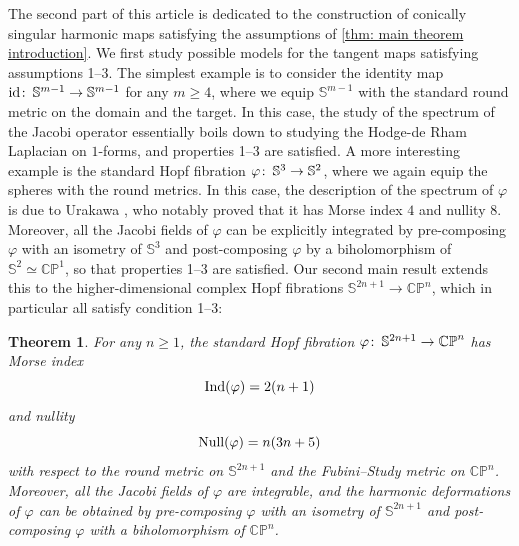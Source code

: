 \documentclass{article}
\numberwithin{equation}{section}        %
\theoremstyle{bfnote}
\newtheorem{thm}{Theorem}[section]          %
\theoremstyle{definition}
\theoremstyle{bfremark}
\newcommand{\col}{\colon \thinspace}        %
\newcommand{\Sp}{\mathbb{S}}                %
\DeclareMathOperator{\id}{id}                   %
\begin{document}
The second part of this article is dedicated to the construction of conically singular harmonic maps satisfying the assumptions of \cref{thm: main theorem introduction}. We first study possible models for the tangent maps satisfying assumptions 1--3. The simplest example is to consider the identity map $\id \col \Sp^{m-1} \to \Sp^{m-1}$ for any $m \geq 4$, where we equip $\Sp^{m-1}$ with the standard round metric on the domain and the target. In this case, the study of the spectrum of the Jacobi operator essentially boils down to studying the Hodge-de Rham Laplacian on $1$-forms, and properties 1--3 are satisfied. A more interesting example is the standard Hopf fibration $\varphi \col \Sp^3 \to \Sp^2$, where we again equip the spheres with the round metrics. In this case, the description of the spectrum of $\varphi$ is due to Urakawa \cite{urakawa1987stability}, who notably proved that it has Morse index $4$ and nullity $8$. Moreover, all the Jacobi fields of $\varphi$ can be explicitly integrated by pre-composing $\varphi$ with an isometry of $\Sp^3$ and post-composing $\varphi$ by a biholomorphism of $\Sp^2 \simeq \mathbb{CP}^1$, so that properties 1--3 are satisfied. Our second main result extends this to the higher-dimensional complex Hopf fibrations $\Sp^{2n+1} \to \mathbb{CP}^n$, which in particular all satisfy condition 1--3:

\begin{thm}     \label{thm: hopf fibrations intro}
    For any $n \geq 1$, the standard Hopf fibration $\varphi \col \Sp^{2n+1} \to \mathbb{CP}^n$ has Morse index 
    \begin{equation*}
        \textup{Ind}(\varphi) = 2(n+1)
    \end{equation*} 
    and nullity 
    \begin{equation*}
        \textup{Null}(\varphi) = n(3n+5)
    \end{equation*}
    with respect to the round metric on $\Sp^{2n+1}$ and the Fubini--Study metric on $\mathbb{CP}^n$. Moreover, all the Jacobi fields of $\varphi$ are integrable, and the harmonic deformations of $\varphi$ can be obtained by pre-composing $\varphi$ with an isometry of $\Sp^{2n+1}$ and post-composing $\varphi$ with a biholomorphism of $\mathbb{CP}^n$.
\end{thm}
\end{document}
